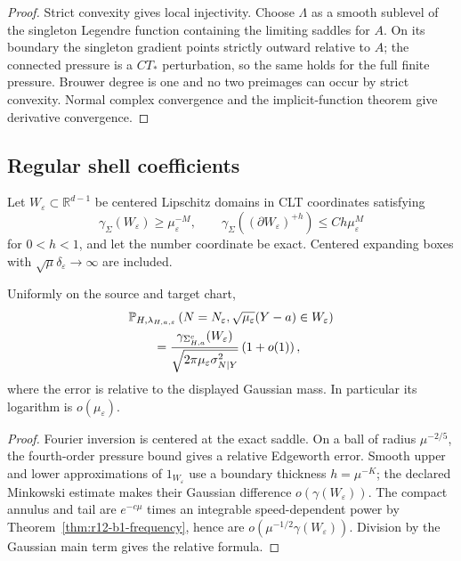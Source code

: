 \begin{proof}
Strict convexity gives local injectivity.  Choose $\Lambda$ as a smooth
sublevel of the singleton Legendre function containing the limiting saddles
for $A$.  On its boundary the singleton gradient points strictly outward
relative to $A$; the connected pressure is a $CT_*$ perturbation, so the same
holds for the full finite pressure.  Brouwer degree is one and no two
preimages can occur by strict convexity.  Normal complex convergence and the
implicit-function theorem give derivative convergence.
\end{proof}

\subsection{Regular shell coefficients}

Let $W_\varepsilon\subset\mathbb R^{d-1}$ be centered Lipschitz domains in
CLT coordinates satisfying
\[
 \gamma_\Sigma(W_\varepsilon)\ge\mu_\varepsilon^{-M},
 \qquad
 \gamma_\Sigma((\partial W_\varepsilon)^{+h})
 \le C h\mu_\varepsilon^M
\]
for $0<h<1$, and let the number coordinate be exact.  Centered expanding boxes
with $\sqrt\mu\delta_\varepsilon\to\infty$ are included.

\begin{theorem}
\label{thm:r12-b1-coefficient}
Uniformly on the source and target chart,
\[
 \begin{aligned}
 &\mathbb P_{H,\lambda_{H,a,\varepsilon}}
 \left(N=N_\varepsilon,
 \sqrt{\mu_\varepsilon}(Y-a)\in W_\varepsilon\right)\\
 &\qquad={\gamma_{\Sigma^c_{H,a}}(W_\varepsilon)\over
 \sqrt{2\pi\mu_\varepsilon\sigma^2_{N\mid Y}}}
 \left(1+o(1)\right),
 \end{aligned}
\]
where the error is relative to the displayed Gaussian mass.  In particular
its logarithm is $o(\mu_\varepsilon)$.
\end{theorem}

\begin{proof}
Fourier inversion is centered at the exact saddle.  On a ball of radius
$\mu^{-2/5}$, the fourth-order pressure bound gives a relative Edgeworth
error.  Smooth upper and lower approximations of $1_{W_\varepsilon}$ use a
boundary thickness $h=\mu^{-K}$; the declared Minkowski estimate makes their
Gaussian difference $o(\gamma(W_\varepsilon))$.  The compact annulus and tail
are $e^{-c\mu}$ times an integrable speed-dependent power by
Theorem~\ref{thm:r12-b1-frequency}, hence are
$o(\mu^{-1/2}\gamma(W_\varepsilon))$.  Division by the Gaussian main term
gives the relative formula.
\end{proof}

